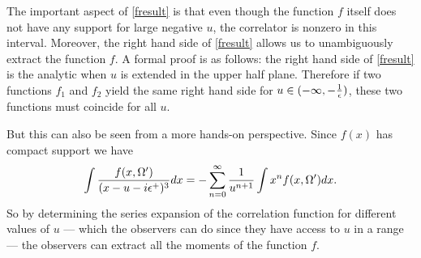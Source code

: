 \documentclass[12pt]{article}
\newcommand{\be}{\begin{equation}}
\newcommand{\ee}{\end{equation}}
\def \sph{{\Omega}}
\begin{document}
The important aspect of \eqref{fresult} is that even though the function $f$ itself does not have any support for large negative $u$, the correlator is nonzero in this interval.  Moreover, the right hand side of \eqref{fresult} allows us to unambiguously extract the function $f$. A formal proof is as follows: the right hand side of \eqref{fresult} is the analytic when $u$ is extended in the upper half plane. Therefore if two functions $f_1$ and $f_2$ yield the same right hand side for  $u \in (-\infty, -{1 \over \epsilon})$, these two functions must coincide for all $u$.

But this can also be seen from a more hands-on perspective. Since $f(x)$ has compact support we have
\be
\label{fseries}
\int {f(x, \sph') \over (x - u - i \epsilon^{+})^3} d x = -\sum_{n=0}^{\infty} {1 \over  u^{n+1}} \int x^n f(x, \sph') d x.
\ee
So by determining the series expansion of the correlation function for different values of $u$ --- which the observers can do since they have access to $u$ in a range  --- the observers can extract all the moments of the function $f$.  
\end{document}

